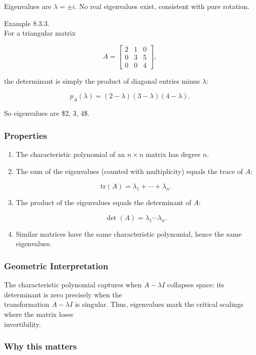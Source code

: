 \documentclass[
  12pt,
  a4paper,
]{article}
\begin{document}
Eigenvalues are \(\lambda = \pm i\). No real eigenvalues exist,
consistent with pure rotation.

Example 8.3.3.\\
For a triangular matrix

\[A = \begin{bmatrix} 2 & 1 & 0 \\ 0 & 3 & 5 \\ 0 & 0 & 4 \end{bmatrix},\]

the determinant is simply the product of diagonal entries minus
\(\lambda\):

\[p_A(\lambda) = (2-\lambda)(3-\lambda)(4-\lambda).\]

So eigenvalues are \$2, 3, 4\$.

\subsubsection{Properties}\label{properties-2}

\begin{enumerate}
\def\labelenumi{\arabic{enumi}.}
\item
  The characteristic polynomial of an \(n \times n\) matrix has degree
  \(n\).
\item
  The sum of the eigenvalues (counted with multiplicity) equals the
  trace of \(A\):

  \[\text{tr}(A) = \lambda_1 + \cdots + \lambda_n.\]
\item
  The product of the eigenvalues equals the determinant of \(A\):

  \[\det(A) = \lambda_1 \cdots \lambda_n.\]
\item
  Similar matrices have the same characteristic polynomial, hence the
  same eigenvalues.
\end{enumerate}

\subsubsection{Geometric
Interpretation}\label{geometric-interpretation-18}

The characteristic polynomial captures when \(A - \lambda I\) collapses
space: its determinant is zero precisely when the\\
transformation \(A - \lambda I\) is singular. Thus, eigenvalues mark the
critical scalings where the matrix loses\\
invertibility.

\subsubsection{Why this matters}\label{why-this-matters-30}
\end{document}
